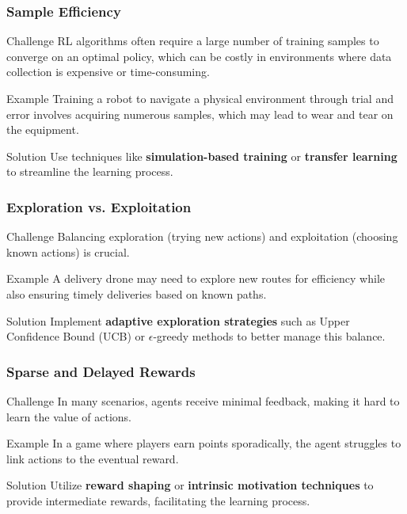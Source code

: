 \documentclass{beamer}
\begin{document}
\begin{frame}[fragile]
    \frametitle{Sample Efficiency}
    \begin{block}{Challenge}
        RL algorithms often require a large number of training samples to converge on an optimal policy, which can be costly in environments where data collection is expensive or time-consuming.
    \end{block}
    \begin{block}{Example}
        Training a robot to navigate a physical environment through trial and error involves acquiring numerous samples, which may lead to wear and tear on the equipment.
    \end{block}
    \begin{block}{Solution}
        Use techniques like \textbf{simulation-based training} or \textbf{transfer learning} to streamline the learning process.
    \end{block}
\end{frame}

\begin{frame}[fragile]
    \frametitle{Exploration vs. Exploitation}
    \begin{block}{Challenge}
        Balancing exploration (trying new actions) and exploitation (choosing known actions) is crucial.
    \end{block}
    \begin{block}{Example}
        A delivery drone may need to explore new routes for efficiency while also ensuring timely deliveries based on known paths.
    \end{block}
    \begin{block}{Solution}
        Implement \textbf{adaptive exploration strategies} such as Upper Confidence Bound (UCB) or $\epsilon$-greedy methods to better manage this balance.
    \end{block}
\end{frame}

\begin{frame}[fragile]
    \frametitle{Sparse and Delayed Rewards}
    \begin{block}{Challenge}
        In many scenarios, agents receive minimal feedback, making it hard to learn the value of actions.
    \end{block}
    \begin{block}{Example}
        In a game where players earn points sporadically, the agent struggles to link actions to the eventual reward.
    \end{block}
    \begin{block}{Solution}
        Utilize \textbf{reward shaping} or \textbf{intrinsic motivation techniques} to provide intermediate rewards, facilitating the learning process.
    \end{block}
\end{frame}
\end{document}
